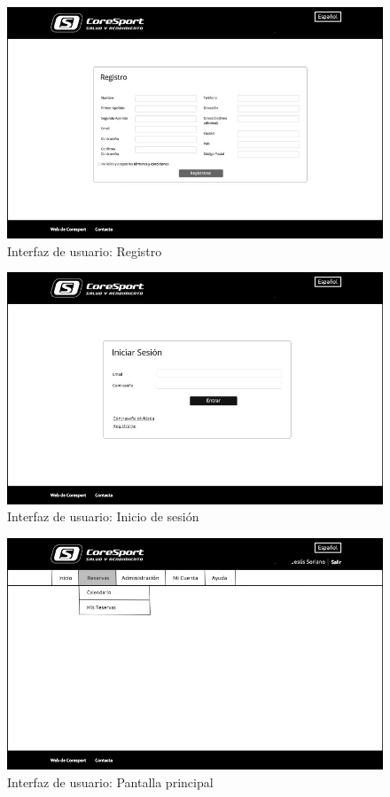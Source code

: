 \begin{figure}[H]
\centering
  \includegraphics[scale=.40]{img/interfaz/registro.jpg}
  \caption{Interfaz de usuario: Registro}
  \label{fig:interfaz-registro}
\end{figure}

\begin{figure}[H]
\centering
  \includegraphics[scale=.40]{img/interfaz/inicio-sesion.jpg}
  \caption{Interfaz de usuario: Inicio de sesión}
  \label{fig:interfaz-inicio-sesion}
\end{figure}


\begin{figure}[H]
\centering
  \includegraphics[scale=.40]{img/interfaz/pantalla-principal.jpg}
  \caption{Interfaz de usuario: Pantalla principal}
  \label{fig:interfaz-pantalla-principal}
\end{figure}

